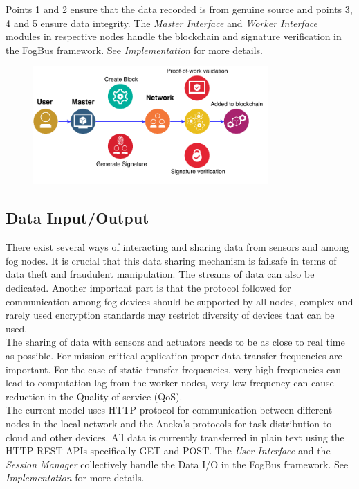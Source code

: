 \documentclass[10pt,journal,compsoc]{IEEEtran}
\begin{document}
Points 1 and 2 ensure that the data recorded is from genuine source and points 3, 4 and 5 ensure data integrity. The \textit{Master Interface} and \textit{Worker Interface} modules in respective nodes handle the blockchain and signature verification in the FogBus framework. See \textit{Implementation} for more details.
\begin{figure}[h]
\centering
\includegraphics[width=9cm]{blockchain}
\end{figure}

\subsection{Data Input/Output}
There exist several ways of interacting and sharing data from sensors and among fog nodes. It is crucial that this data sharing mechanism is failsafe in terms of data theft and fraudulent manipulation. The streams of data can also be dedicated. Another important part is that the protocol followed for communication among fog devices should be supported by all nodes, complex and rarely used encryption standards may restrict diversity of devices that can be used. \\
The sharing of data with sensors and actuators needs to be as close to real time as possible. For mission critical application proper data transfer frequencies are important. For the case of static transfer frequencies, very high frequencies can lead to computation lag from the worker nodes, very low frequency can cause reduction in the Quality-of-service (QoS). \\
The current model uses HTTP protocol for communication between different nodes in the local network and the Aneka’s protocols for task distribution to cloud and other devices. All data is currently transferred in plain text using the HTTP REST APIs specifically GET and POST. The \textit{User Interface} and the \textit{Session Manager} collectively handle the Data I/O in the FogBus framework. See \textit{Implementation} for more details.
\end{document}
